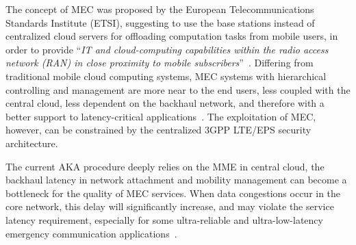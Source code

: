 \documentclass{ieeeaccess}
\begin{document}
	The concept of MEC was proposed by the European Telecommunications Standards Institute (ETSI), suggesting to use the base stations instead of centralized cloud servers for offloading computation tasks from mobile users, in order to provide ``\textit{IT and cloud-computing capabilities within the radio access network (RAN) in close proximity to mobile subscribers}''~\cite{etsi2014mobile}.
	Differing from traditional mobile cloud computing systems, MEC systems with hierarchical controlling and management are more near to the end users, less coupled with the central cloud, less dependent on the backhaul network, and therefore with a better support to latency-critical applications~\cite{mao2017survey}. The exploitation of MEC, however, can be constrained by the centralized 3GPP LTE/EPS security architecture.
	
	The current AKA procedure deeply relies on the MME in central cloud, the backhaul latency in network attachment and mobility management can become a bottleneck for the quality of MEC services. When data congestions occur in the core network, this delay will significantly increase, and may violate the service latency requirement, especially for some ultra-reliable and ultra-low-latency emergency communication applications~\cite{metis2015updated}.
	
\end{document}
